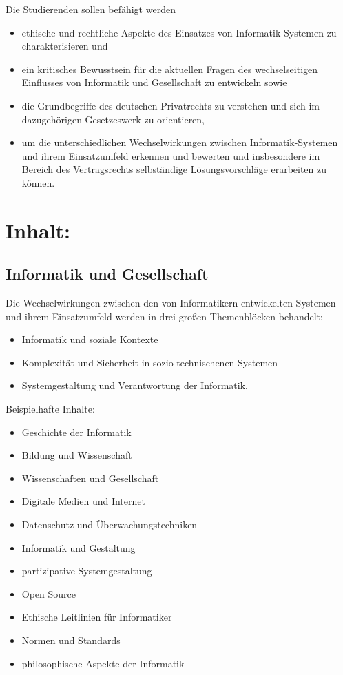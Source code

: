 Die Studierenden sollen befähigt werden

\begin{itemize}
\tightlist
\item
  ethische und rechtliche Aspekte des Einsatzes von Informatik-Systemen
  zu charakterisieren und
\item
  ein kritisches Bewusstsein für die aktuellen Fragen des
  wechselseitigen Einflusses von Informatik und Gesellschaft zu
  entwickeln sowie
\item
  die Grundbegriffe des deutschen Privatrechts zu verstehen und sich im
  dazugehörigen Gesetzeswerk zu orientieren,
\item
  um die unterschiedlichen Wechselwirkungen zwischen Informatik-Systemen
  und ihrem Einsatzumfeld erkennen und bewerten und insbesondere im
  Bereich des Vertragsrechts selbständige Lösungsvorschläge erarbeiten
  zu können.
\end{itemize}

\section*{Inhalt:}\label{inhalt-16}

\subsection*{Informatik und
Gesellschaft}\label{informatik-und-gesellschaft}

Die Wechselwirkungen zwischen den von Informatikern entwickelten
Systemen und ihrem Einsatzumfeld werden in drei großen Themenblöcken
behandelt:

\begin{itemize}
\tightlist
\item
  Informatik und soziale Kontexte
\item
  Komplexität und Sicherheit in sozio-technischenen Systemen
\item
  Systemgestaltung und Verantwortung der Informatik.
\end{itemize}

Beispielhafte Inhalte:

\begin{itemize}
\tightlist
\item
  Geschichte der Informatik
\item
  Bildung und Wissenschaft
\item
  Wissenschaften und Gesellschaft
\item
  Digitale Medien und Internet
\item
  Datenschutz und Überwachungstechniken
\item
  Informatik und Gestaltung
\item
  partizipative Systemgestaltung
\item
  Open Source
\item
  Ethische Leitlinien für Informatiker
\item
  Normen und Standards
\item
  philosophische Aspekte der Informatik
\end{itemize}


